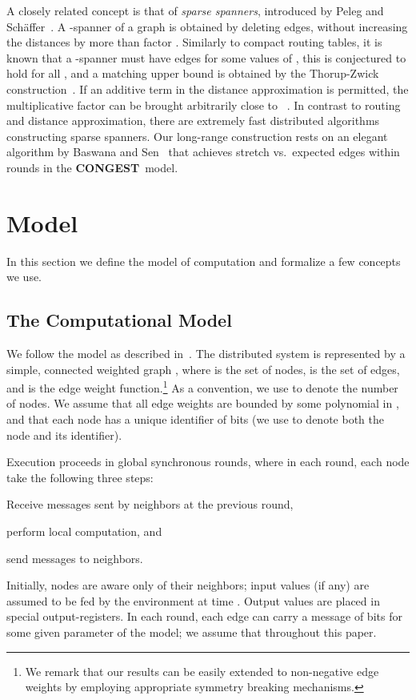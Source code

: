 \documentclass[letterpaper,11pt]{article}
\newcommand{\CONGEST}{\textbf{CONGEST}}
\begin{document}
A closely related concept is that of \emph{sparse spanners}, introduced
by Peleg and Sch\"affer~\cite{PS89}. A -spanner of a graph is obtained by
deleting edges, without increasing the distances by more than
factor . Similarly to compact routing tables, it is known that a -spanner must
have  edges for some values of , this is
conjectured to hold for all , and a matching upper bound is obtained
by the Thorup-Zwick construction~\cite{TZ-05}. If an additive term
in the distance approximation is permitted, the multiplicative factor can be
brought arbitrarily close to ~\cite{EP04}. In contrast to routing and
distance approximation, there are extremely fast distributed algorithms
constructing sparse spanners.
Our long-range construction rests on an elegant
algorithm by Baswana and Sen~\cite{baswana07} that achieves stretch  vs.\  expected edges
within  rounds in the \CONGEST\ model. 








\section{Model}
\label{sec-model}
In this section we define the model of computation and formalize a few
concepts we use.

\subsection{The Computational Model} 
We follow the  model as described in~\cite{Peleg:book}. The 
distributed system is represented by a simple, connected weighted
graph , where  is the set of nodes,  is the set of
edges, and  is the edge weight function.\footnote{We remark
that our results can be easily extended to non-negative edge weights by
employing appropriate symmetry breaking mechanisms.}
As a convention, we use  to denote the number of nodes. We assume that all
edge weights are bounded by some polynomial in , and that each node 
has a unique identifier of  bits (we use  to denote both the
node and its identifier).

Execution proceeds in global synchronous rounds, where
in each round, each node take the following three steps:
\begin{inparaenum}[(1)]
\item Receive messages sent by neighbors at the previous round,
\item perform local computation, and
\item send messages to neighbors.
\end{inparaenum}
Initially, nodes are aware only of their neighbors; input values (if any) are
assumed to be fed by the environment at time . Output values are placed in
special output-registers. In each round, each edge can carry a message of 
bits for some given parameter  of the model; we assume that  throughout this paper.
\end{document}
